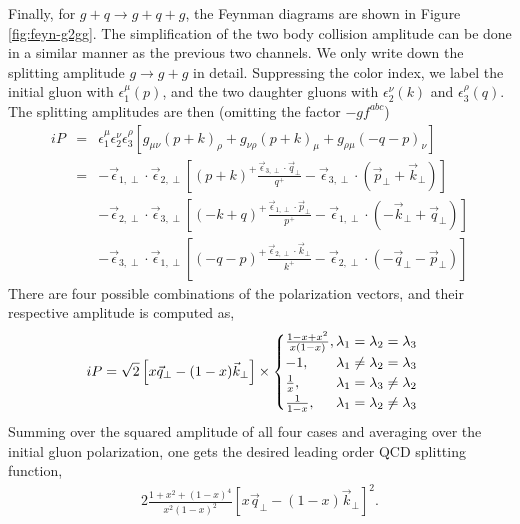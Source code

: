 \begin{appendices}
Finally, for $g+q\rightarrow g+q+g$, the Feynman diagrams are shown in Figure \ref{fig:feyn-g2gg}. 
The simplification of the two body collision amplitude can be done in a similar manner as the previous two channels. 
We only write down the splitting amplitude $g\rightarrow g+ g$ in detail.
Suppressing the color index, we label the initial gluon with $\epsilon_1^\mu(p)$, and the two daughter gluons with $\epsilon_2^\nu(k)$ and $\epsilon_3^\rho(q)$.
The splitting amplitudes are then (omitting the factor $-gf^{abc}$)
\begin{eqnarray}
iP &=& \epsilon^\mu_1\epsilon^\nu_2\epsilon^\rho_3
\left[
g_{\mu\nu} (p+k)_{\rho} +  g_{\nu\rho} (p+k)_{\mu} + g_{\rho\mu} (-q-p)_{\nu}
\right]\\
&=& -\vec{\epsilon}_{1,\perp}\cdot \vec{\epsilon}_{2,\perp} \left[(p+k)^+\frac{\vec{\epsilon}_{3,\perp}\cdot \vec{q}_\perp}{q^+} - \vec{\epsilon}_{3,\perp}\cdot (\vec{p}_\perp+\vec{k}_\perp)\right] \\\nonumber
&&-\vec{\epsilon}_{2,\perp}\cdot \vec{\epsilon}_{3,\perp} \left[(-k+q)^+\frac{\vec{\epsilon}_{1,\perp}\cdot \vec{p}_\perp}{p^+} - \vec{\epsilon}_{1,\perp}\cdot (-\vec{k}_\perp+\vec{q}_\perp)\right]
\\\nonumber
&&-\vec{\epsilon}_{3,\perp}\cdot \vec{\epsilon}_{1,\perp} \left[(-q-p)^+\frac{\vec{\epsilon}_{2,\perp}\cdot \vec{k}_\perp}{k^+} - \vec{\epsilon}_{2,\perp}\cdot (-\vec{q}_\perp-\vec{p}_\perp)\right]
\end{eqnarray}
There are four possible combinations of the polarization vectors, and their respective amplitude is computed as,
\begin{eqnarray}
iP = \sqrt{2}\left[x\vec{q}_\perp - (1-x)\vec{k}_\perp\right]\times 
\begin{cases}
\frac{1-x+x^2}{x(1-x)}, \hfill \lambda_1=\lambda_2=\lambda_3\\
-1, \hfill \lambda_1\neq\lambda_2=\lambda_3 \\
\frac{1}{x}, \hfill \lambda_1=\lambda_3\neq\lambda_2\\
\frac{1}{1-x}, \hfill \lambda_1=\lambda_2\neq\lambda_3
\end{cases}
\end{eqnarray}
Summing over the squared amplitude of all four cases and averaging over the initial gluon polarization, one gets the desired leading order QCD splitting function,
\begin{eqnarray}
2\frac{1+x^2+(1-x)^4}{x^2(1-x)^2} \left[x\vec{q}_\perp - (1-x)\vec{k}_\perp\right]^2.
\end{eqnarray}


\end{appendices}
